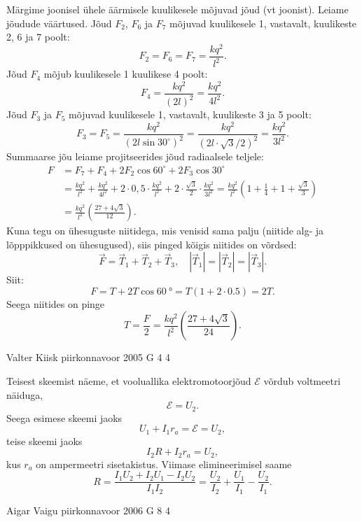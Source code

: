 \documentclass[11pt]{article}
\begin{document}
{{Märgime joonisel ühele äärmisele kuulikesele mõjuvad jõud (vt joonist). Leiame jõudude väärtused. Jõud $F_2$, $F_6$ ja $F_7$ mõjuvad kuulikesele 1, vastavalt, kuulikeste 2, 6 ja 7 poolt:
\[
F_2 = F_6 = F_7 = \frac{kq^2}{l^2}.
\]
Jõud $F_4$ mõjub kuulikesele 1 kuulikese 4 poolt:
\[
F_{4}=\frac{k q^{2}}{(2 l)^{2}}=\frac{k q^{2}}{4 l^{2}}.
\]
Jõud $F_3$ ja $F_5$ mõjuvad kuulikesele 1, vastavalt, kuulikeste 3 ja 5 poolt:
\[
F_{3}=F_{5}=\frac{k q^{2}}{\left(2 l \sin 30^{\circ}\right)^{2}}=\frac{k q^{2}}{(2 l \cdot \sqrt{3} / 2)^{2}}=\frac{k q^{2}}{3 l^{2}}.
\]
Summaarse jõu leiame projitseerides jõud radiaalsele teljele:
\[
\begin{aligned}
F&=F_{7}+F_{4}+2 F_{2} \cos 60^{\circ}+2 F_{3} \cos 30^{\circ}\\
&=\frac{k q^{2}}{l^{2}}+\frac{k q^{2}}{4 l^{2}}+2 \cdot 0,5 \cdot \frac{k q^{2}}{l^{2}}+2 \cdot \frac{\sqrt{3}}{2} \cdot \frac{k q^{2}}{3 l^{2}}=\frac{k q^{2}}{l^{2}}\left(1+\frac{1}{4}+1+\frac{\sqrt{3}}{3}\right)\\
&=\frac{k q^{2}}{l^{2}}\left(\frac{27+4 \sqrt{3}}{12}\right).
\end{aligned}
\]
Kuna tegu on ühesuguste niitidega, mis venisid sama palju (niitide alg- ja lõpppikkused on ühesugused), siis pinged kõigis niitides on võrdsed: 
\[
\vec{F}=\vec{T}_{1}+\vec{T}_{2}+\vec{T}_{3}, \quad\left|\vec{T}_{1}\right|=\left|\vec{T}_{2}\right|=\left|\vec{T}_{3}\right|.
\]
Siit:
\[
F = T + 2T \cos \SI{60}{\degree} = T (\num{1} + \num{2} \cdot \num{0,5}) = 2T.
\]
Seega niitides on pinge
\[
T=\frac{F}{2}=\frac{k q^{2}}{l^{2}}\left(\frac{27+4 \sqrt{3}}{24}\right).
\]
\fi
}

{Valter Kiisk} %
{piirkonnavoor} %
{2005} %
{G 4} %
{4} %
{

\ifSolution
Teisest skeemist näeme, et vooluallika elektromotoorjõud $\mathcal E$ võrdub voltmeetri näiduga,
\[
\mathcal E = U_2.
\]
Seega esimese skeemi jaoks
\[
U_1 + I_1r_a = \mathcal E = U_2,
\]
teise skeemi jaoks
\[
I_2R + I_2r_a = U_2,
\]
kus $r_a$ on ampermeetri sisetakistus. Viimase elimineerimisel saame
\[
R=\frac{I_{1} U_{2}+I_{2} U_{1}-I_{2} U_{2}}{I_{1} I_{2}}=\frac{U_{2}}{I_{2}}+\frac{U_{1}}{I_{1}}-\frac{U_{2}}{I_{1}}.
\]
\fi
}

{Aigar Vaigu} %
{piirkonnavoor} %
{2006} %
{G 8} %
{4} %
{

}}
\end{document}
